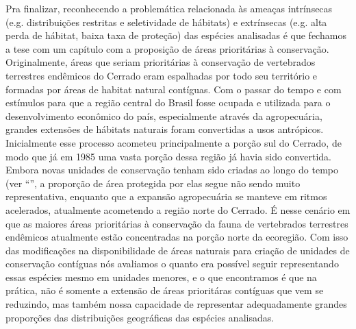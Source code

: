 \documentclass[12pt,openright,oneside,a4paper,english]{abntex2}
\begin{document}
Pra finalizar, reconhecendo a problemática relacionada às ameaças intrínsecas (e.g. distribuições restritas e seletividade de hábitats) e extrínsecas (e.g. alta perda de hábitat, baixa taxa de proteção) das espécies analisadas é que fechamos a tese com um capítulo com a proposição de áreas prioritárias à conservação. Originalmente, áreas que seriam prioritárias à conservação de vertebrados terrestres endêmicos do Cerrado eram espalhadas por todo seu território e formadas por áreas de habitat natural contíguas. Com o passar do tempo e com estímulos para que a região central do Brasil fosse ocupada e utilizada para o desenvolvimento econômico do país, especialmente através da agropecuária, grandes extensões de hábitats naturais foram convertidas a usos antrópicos. Inicialmente esse processo acometeu principalmente a porção sul do Cerrado, de modo que já em 1985 uma vasta porção dessa região já havia sido convertida. Embora novas unidades de conservação tenham sido criadas ao longo do tempo (ver “\textit{}”, a proporção de área protegida por elas segue não sendo muito representativa, enquanto que a expansão agropecuária se manteve em ritmos acelerados, atualmente acometendo a região norte do Cerrado. É nesse cenário em que as maiores áreas prioritárias à conservação da fauna de vertebrados terrestres endêmicos atualmente estão concentradas na porção norte da ecoregião. Com isso das modificações na disponibilidade de áreas naturais para criação de unidades de conservação contíguas nós avaliamos o quanto era possível seguir representando essas espécies mesmo em unidades menores, e o que encontramos é que na prática, não é somente a extensão de áreas prioritáras contíguas que vem se reduzindo, mas também nossa capacidade de representar adequadamente grandes proporções das distribuições geográficas das espécies analisadas.
\end{document}
